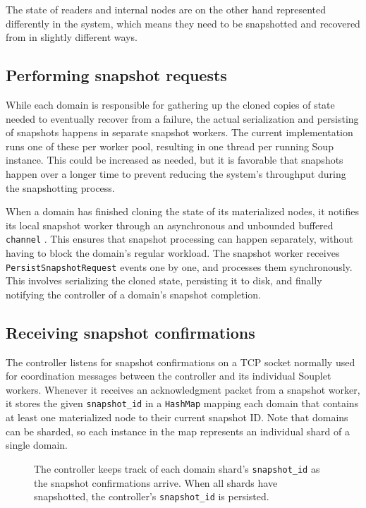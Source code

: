 \documentclass[b5paper]{report}
\begin{document}
The state of readers and internal nodes are on the other hand represented
differently in the system, which means they need to be snapshotted and recovered
from in slightly different ways.

\subsection{Performing snapshot requests}
While each domain is responsible for gathering up the cloned copies of state
needed to eventually recover from a failure, the actual serialization and
persisting of snapshots happens in separate snapshot workers. The current
implementation runs one of these per worker pool, resulting in one thread
per running Soup instance. This could be increased as needed, but it is
favorable that snapshots happen over a longer time to prevent reducing the
system's throughput during the snapshotting process.

When a domain has finished cloning the state of its materialized nodes, it
notifies its local snapshot worker through an asynchronous and unbounded
buffered \texttt{channel} \cite{rust-channels}. This ensures that snapshot
processing can happen separately, without having to block the domain's regular
workload. The snapshot worker receives \texttt{PersistSnapshotRequest} events
one by one, and processes them synchronously. This involves serializing the
cloned state, persisting it to disk, and finally notifying the controller of a
domain's snapshot completion.

\subsection{Receiving snapshot confirmations}
The controller listens for snapshot confirmations on a TCP socket normally used
for coordination messages between the controller and its individual Souplet
workers. Whenever it receives an acknowledgment packet from a snapshot worker,
it stores the given \texttt{snapshot\_id} in a \texttt{HashMap} mapping each
domain that contains at least one materialized node to their current snapshot
ID. Note that domains can be sharded, so each instance in the map represents an
individual shard of a single domain.

\begin{figure}[H]
  
  \caption{
    The controller keeps track of each domain shard's \texttt{snapshot\_id} as
    the snapshot confirmations arrive. When all shards have snapshotted, the
    controller's \texttt{snapshot\_id} is persisted.
    \label{fig:snapshot-id}
  }
\end{figure}
\end{document}
